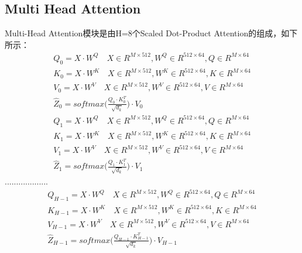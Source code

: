 \documentclass{article}
\begin{document}
\subsection{Multi Head Attention}
Multi-Head Attention模块是由H=8个Scaled Dot-Product Attention的组成，如下所示：
\begin{equation}
\begin{aligned}
Q_{0} = X \cdot W^{Q} \quad X \in R^{M \times 512}, W^{Q} \in R^{512 \times 64}, Q \in R^{M \times 64} \\
K_{0} = X \cdot W^{K} \quad X \in R^{M \times 512}, W^{K} \in R^{512 \times 64}, K \in R^{M \times 64} \\
V_{0} = X \cdot W^{V} \quad X \in R^{M \times 512}, W^{V} \in R^{512 \times 64}, V \in R^{M \times 64} \\
\hat{Z}_{0} = softmax \bigg( \frac{Q_{0} \cdot K^{T}_{0}}{\sqrt{d_{k}}} \bigg) \cdot V_{0}
\end{aligned}
\label{e000113}
\end{equation}
\begin{equation}
\begin{aligned}
Q_{1} = X \cdot W^{Q} \quad X \in R^{M \times 512}, W^{Q} \in R^{512 \times 64}, Q \in R^{M \times 64} \\
K_{1} = X \cdot W^{K} \quad X \in R^{M \times 512}, W^{K} \in R^{512 \times 64}, K \in R^{M \times 64} \\
V_{1} = X \cdot W^{V} \quad X \in R^{M \times 512}, W^{V} \in R^{512 \times 64}, V \in R^{M \times 64} \\
\hat{Z}_{1} = softmax \bigg( \frac{Q_{1} \cdot K^{T}_{1}}{\sqrt{d_{k}}} \bigg) \cdot V_{1}
\end{aligned}
\label{e000114}
\end{equation}
...................
\begin{equation}
\begin{aligned}
Q_{H-1} = X \cdot W^{Q} \quad X \in R^{M \times 512}, W^{Q} \in R^{512 \times 64}, Q \in R^{M \times 64} \\
K_{H-1} = X \cdot W^{K} \quad X \in R^{M \times 512}, W^{K} \in R^{512 \times 64}, K \in R^{M \times 64} \\
V_{H-1} = X \cdot W^{V} \quad X \in R^{M \times 512}, W^{V} \in R^{512 \times 64}, V \in R^{M \times 64} \\
\hat{Z}_{H-1} = softmax \bigg( \frac{Q_{H-1} \cdot K^{T}_{H-1}}{\sqrt{d_{k}}} \bigg) \cdot V_{H-1}
\end{aligned}
\label{e000115}
\end{equation}
\end{document}
